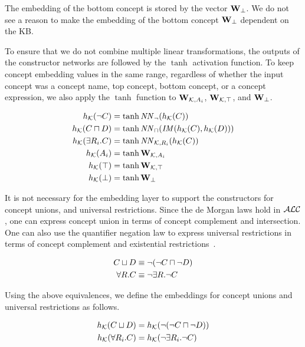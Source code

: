 The embedding of the bottom concept is stored by the vector $\mathbf{W}_\bot$. We do not see a reason to make the embedding of the bottom concept $\mathbf{W}_\bot$ dependent on the KB.

To ensure that we do not combine multiple linear transformations, the outputs of the constructor networks are followed by the $\tanh$ activation function.
To keep concept embedding values in the same range, regardless of whether the input concept was a concept name, top concept, bottom concept, or a concept expression, we also apply the $\tanh$ function to $\mathbf{W}_{\mathcal{K},A_i}$, $\mathbf{W}_{\mathcal{K},\top}$, and $\mathbf{W}_{\bot}$.

\begin{equation}
\label{eq:restricted-encoder}
\begin{split}
    h_{\mathcal{K}}(\lnot C) &= \tanh \mathit{NN}_{\lnot}(h_{\mathcal{K}}(C)) \\
    h_{\mathcal{K}}(C \sqcap D) &= \tanh \mathit{NN}_{\sqcap}(\mathit{IM}(h_{\mathcal{K}}(C), h_{\mathcal{K}}(D))) \\
    h_{\mathcal{K}}(\exists R_i . C) &= \tanh \mathit{NN}_{\mathcal{K},R_i}(h_{\mathcal{K}}(C)) \\
    h_{\mathcal{K}}(A_i) &= \tanh \mathbf{W}_{\mathcal{K},A_i} \\
    h_{\mathcal{K}}(\top) &= \tanh \mathbf{W}_{\mathcal{K},\top} \\
    h_{\mathcal{K}}(\bot) &= \tanh \mathbf{W}_{\bot}
\end{split}
\end{equation}

It is not necessary for the embedding layer to support the constructors for concept unions, and universal restrictions.
Since the de Morgan laws hold in $\mathcal{ALC}$, one can express concept union in terms of concept complement and intersection.
One can also use the quantifier negation law to express universal restrictions in terms of concept complement and existential restrictions~\cite{rudolph_foundations_2011}.

\begin{equation}
\label{eq:alc-demorgan}
\begin{split}
C \sqcup D &\equiv \lnot (\lnot C \sqcap \lnot D) \\
\forall R . C &\equiv \lnot \exists R . \lnot C
\end{split}
\end{equation}

Using the above equivalences, we define the embeddings for concept unions and universal restrictions as follows.

\begin{equation}
\label{eq:encoder-cheats}
\begin{split}
    h_{\mathcal{K}}(C \sqcup D) &= h_{\mathcal{K}}(\lnot (\lnot C \sqcap \lnot D)) \\
    h_{\mathcal{K}}(\forall R_i . C) &= h_{\mathcal{K}}( \lnot \exists R_i . \lnot C )
\end{split}
\end{equation}

